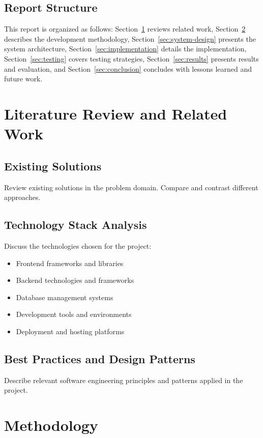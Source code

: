 \documentclass[12pt,a4paper]{article}
\begin{document}
\subsection{Report Structure}
This report is organized as follows: Section~\ref{sec:literature} reviews related work, Section~\ref{sec:methodology} describes the development methodology, Section~\ref{sec:system-design} presents the system architecture, Section~\ref{sec:implementation} details the implementation, Section~\ref{sec:testing} covers testing strategies, Section~\ref{sec:results} presents results and evaluation, and Section~\ref{sec:conclusion} concludes with lessons learned and future work.

\section{Literature Review and Related Work}
\label{sec:literature}

\subsection{Existing Solutions}
Review existing solutions in the problem domain. Compare and contrast different approaches.

\subsection{Technology Stack Analysis}
Discuss the technologies chosen for the project:
\begin{itemize}
    \item Frontend frameworks and libraries
    \item Backend technologies and frameworks
    \item Database management systems
    \item Development tools and environments
    \item Deployment and hosting platforms
\end{itemize}

\subsection{Best Practices and Design Patterns}
Describe relevant software engineering principles and patterns applied in the project.

\section{Methodology}
\label{sec:methodology}
\end{document}
